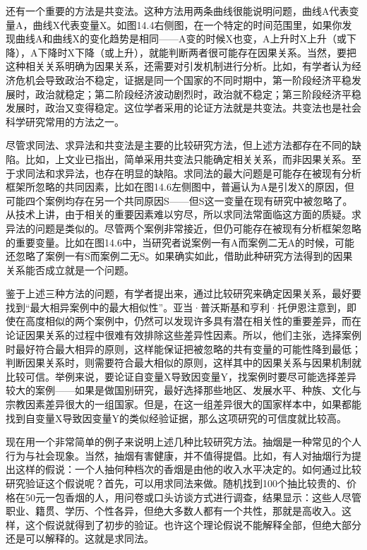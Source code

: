 还有一个重要的方法是共变法。这种方法用两条曲线很能说明问题，曲线A代表变量A，曲线X代表变量X。如图14.4右侧图，在一个特定的时间范围里，如果你发现曲线A和曲线X的变化趋势是相同——A变的时候X也变，A上升时X上升（或下降），A下降时X下降（或上升），就能判断两者很可能存在因果关系。当然，要把这种相关关系明确为因果关系，还需要对引发机制进行分析。比如，有学者认为经济危机会导致政治不稳定，证据是同一个国家的不同时期中，第一阶段经济平稳发展时，政治就稳定；第二阶段经济波动剧烈时，政治就不稳定；第三阶段经济平稳发展时，政治又变得稳定。这位学者采用的论证方法就是共变法。共变法也是社会科学研究常用的方法之一。

尽管求同法、求异法和共变法是主要的比较研究方法，但上述方法都存在不同的缺陷。比如，上文业已指出，简单采用共变法只能确定相关关系，而非因果关系。至于求同法和求异法，也存在明显的缺陷。求同法的最大问题是可能存在被现有分析框架所忽略的共同因素，比如在图14.6左侧图中，普遍认为A是引发X的原因，但可能四个案例均存在另一个共同原因S——但S这一变量在现有研究中被忽略了。从技术上讲，由于相关的重要因素难以穷尽，所以求同法常面临这方面的质疑。求异法的问题是类似的。尽管两个案例非常接近，但仍可能存在被现有分析框架忽略的重要变量。比如在图14.6中，当研究者说案例一有A而案例二无A的时候，可能还忽略了案例一有S而案例二无S。如果确实如此，借助此种研究方法得到的因果关系能否成立就是一个问题。

鉴于上述三种方法的问题，有学者提出来，通过比较研究来确定因果关系，最好要找到“最大相异案例中的最大相似性”。亚当·普沃斯基和亨利·托伊恩注意到，即使在高度相似的两个案例中，仍然可以发现许多具有潜在相关性的重要差异，而在论证因果关系的过程中很难有效排除这些差异性因素。所以，他们主张，选择案例时最好符合最大相异的原则，这样能保证把被忽略的共有变量的可能性降到最低；判断因果关系时，则需要符合最大相似的原则，这样其中的因果关系与因果机制就比较可信。举例来说，要论证自变量X导致因变量Y，找案例时要尽可能选择差异较大的案例——如果是做国别研究，最好选择那些地区、发展水平、种族、文化与宗教因素差异很大的一组国家。但是，在这一组差异很大的国家样本中，如果都能找到自变量X导致因变量Y的类似经验证据，那么这项研究的可信度就比较高。

现在用一个非常简单的例子来说明上述几种比较研究方法。抽烟是一种常见的个人行为与社会现象。当然，抽烟有害健康，并不值得提倡。比如，有人对抽烟行为提出这样的假说：一个人抽何种档次的香烟是由他的收入水平决定的。如何通过比较研究验证这个假说呢？首先，可以用求同法来做。随机找到100个抽比较贵的、价格在50元一包香烟的人，用问卷或口头访谈方式进行调查，结果显示：这些人尽管职业、籍贯、学历、个性各异，但绝大多数人都有一个共性，那就是高收入。这样，这个假说就得到了初步的验证。也许这个理论假说不能解释全部，但绝大部分还是可以解释的。这就是求同法。

